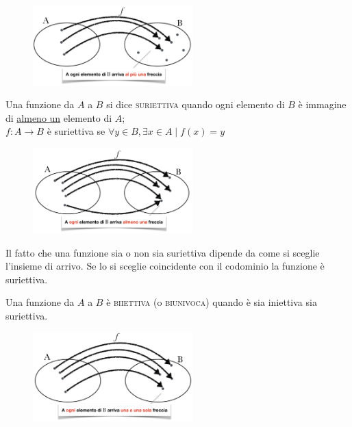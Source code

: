 \begin{figure}[htpb!]
  \centering
  \includegraphics[width=0.55\textwidth]{img/3_funz.png}
\end{figure}

\begin{definizione}
Una funzione da $A$ a $B$ si dice \textsc{suriettiva} quando ogni elemento di 
$B$ è immagine di \underline{almeno un} elemento di $A$;\\

$f: A\to B$ è suriettiva se $\forall y\in B, \exists x\in A \mid f(x)=y$
\end{definizione}

\begin{figure}[htpb!]
  \centering
  \includegraphics[width=0.55\textwidth]{img/4_funz.png}
\end{figure}

Il fatto che una funzione sia o non sia suriettiva dipende da come si sceglie 
l'insieme di arrivo. Se lo si sceglie coincidente con il codominio la 
funzione è suriettiva.\\
%
\begin{definizione}
Una funzione da $A$ a $B$ è \textsc{biiettiva} (o \textsc{biunivoca}) quando 
è sia iniettiva sia suriettiva.\\
\end{definizione}

\begin{figure}[htpb!]
  \centering
  \includegraphics[width=0.55\textwidth]{img/5_funz.png}
\end{figure}

